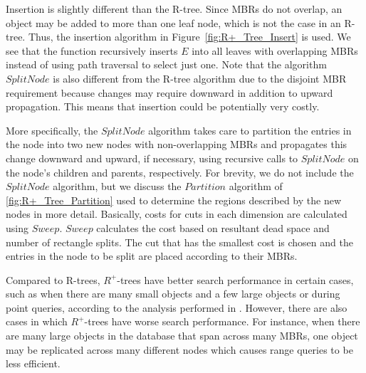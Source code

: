 Insertion is slightly different than the R-tree. Since MBRs do not overlap, an
object may be added to more than one leaf node, which is not the case in an R-tree. 
Thus, the insertion algorithm in Figure~\ref{fig:R+_Tree_Insert} is used. We see that
the function recursively inserts $E$ into all leaves with overlapping MBRs instead of 
using path traversal to select just one. Note that the algorithm $SplitNode$ is 
also different from the R-tree algorithm due to the disjoint MBR requirement because
changes may require downward in addition to upward propagation. This means that insertion
could be potentially very costly.

More specifically, the $SplitNode$ algorithm takes care to partition the entries in 
the node into two new nodes with non-overlapping MBRs and propagates this change 
downward and upward, if necessary, using recursive calls to $SplitNode$ on the node's
children and parents, respectively. For brevity, we do not include the $SplitNode$ 
algorithm, but we discuss the $Partition$ algorithm of \ref{fig:R+_Tree_Partition} 
used to determine the regions described by the new nodes in more detail. Basically, 
costs for cuts in each dimension are calculated using $Sweep$. $Sweep$ calculates the
cost based on resultant dead space and number of rectangle splits. The cut that has 
the smallest cost is chosen and the entries in the node to be split are placed 
according to their MBRs. 

Compared to R-trees, $R^{+}$-trees have better search performance in certain cases,
such as when there are many small objects and a few large objects or during point 
queries, according to the analysis performed in \cite{sellisroussopoulosfaloutsos87}. 
However, there are also cases in which $R^{+}$-trees have worse search performance. 
For instance, when there are many large objects in the database that span across many
MBRs, one object may be replicated across many different nodes which causes range
queries to be less efficient.





